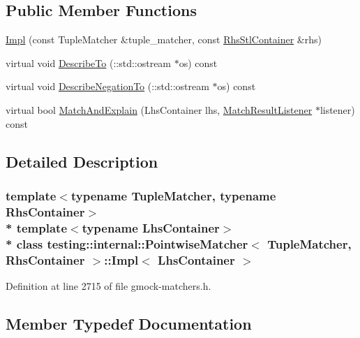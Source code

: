 \subsection*{Public Member Functions}
\begin{DoxyCompactItemize}
\item 
\hyperlink{classtesting_1_1internal_1_1_pointwise_matcher_1_1_impl_aaf6841b254ef78395919dfc5705dd152}{Impl} (const Tuple\+Matcher \&tuple\+\_\+matcher, const \hyperlink{classtesting_1_1internal_1_1_pointwise_matcher_aadbaec8c93351f29b103816c2e397edd}{Rhs\+Stl\+Container} \&rhs)
\item 
virtual void \hyperlink{classtesting_1_1internal_1_1_pointwise_matcher_1_1_impl_a34f78176359346ba3fd46c7e4c7b08cf}{Describe\+To} (\+::std\+::ostream $\ast$os) const 
\item 
virtual void \hyperlink{classtesting_1_1internal_1_1_pointwise_matcher_1_1_impl_a2098bacac67c13d29709d357033e2d3a}{Describe\+Negation\+To} (\+::std\+::ostream $\ast$os) const 
\item 
virtual bool \hyperlink{classtesting_1_1internal_1_1_pointwise_matcher_1_1_impl_ad3cad1e0b3e5d3a204c5b0f5a95d178b}{Match\+And\+Explain} (Lhs\+Container lhs, \hyperlink{classtesting_1_1_match_result_listener}{Match\+Result\+Listener} $\ast$listener) const 
\end{DoxyCompactItemize}


\subsection{Detailed Description}
\subsubsection*{template$<$typename Tuple\+Matcher, typename Rhs\+Container$>$\\*
template$<$typename Lhs\+Container$>$\\*
class testing\+::internal\+::\+Pointwise\+Matcher$<$ Tuple\+Matcher, Rhs\+Container $>$\+::\+Impl$<$ Lhs\+Container $>$}



Definition at line 2715 of file gmock-\/matchers.\+h.



\subsection{Member Typedef Documentation}
